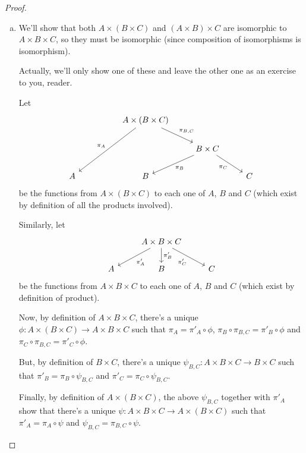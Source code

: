 \begin{proof}
\begin{enumerate}[(a)]
		\item We'll show that both $A\times(B\times C)$ and $(A\times B)\times C$ are isomorphic to $A\times B\times C$, so they must be isomorphic (since composition of isomorphisms is isomorphism).
		
		Actually, we'll only show one of these and leave the other one as an exercise to you, reader.
		
		Let
		\[\begin{tikzcd}
		&  & A\times(B\times C) \arrow[lldd, "\pi_A"'] \arrow[rd, "{\pi_{B,C}}"] &                                                    &   \\
		&  &                                                                     & B\times C \arrow[rd, "\pi_C"'] \arrow[ld, "\pi_B"] &   \\
		A &  & B                                                                   &                                                    & C
		\end{tikzcd}\]be the functions from $A\times(B\times C)$ to each one of $A$, $B$ and $C$ (which exist by definition of all the products involved).
		
		Similarly, let
		\[\begin{tikzcd}
		& A\times B\times C \arrow[ld, "\pi'_A"] \arrow[d, "\pi'_B"] \arrow[rd, "\pi'_C"'] &   \\
		A & B                                                                               & C
		\end{tikzcd}\]be the functions from $A\times B\times C$ to each one of $A$, $B$ and $C$ (which exist by definition of product).
		
		Now, by definition of $A\times B\times C$, there's a unique $\phi:A\times(B\times C)\to A\times B\times C$ such that $\pi_A=\pi'_A\circ\phi$, $\pi_B\circ\pi_{B,C}=\pi'_B\circ\phi$ and $\pi_C\circ\pi_{B,C}=\pi'_C\circ\phi$.
		
		But, by definition of $B\times C$, there's a unique $\psi_{B,C}:A\times B\times C\to B\times C$ such that $\pi'_B=\pi_B\circ\psi_{B,C}$ and $\pi'_C=\pi_C\circ\psi_{B,C}$.
		
		Finally, by definition of $A\times (B\times C)$, the above $\psi_{B,C}$ together with $\pi'_A$ show that there's a unique $\psi:A\times B\times C\to A\times(B\times C)$ such that $\pi'_A=\pi_A\circ\psi$ and $\psi_{B,C}=\pi_{B,C}\circ\psi$.
		

\end{enumerate}
\end{proof}
